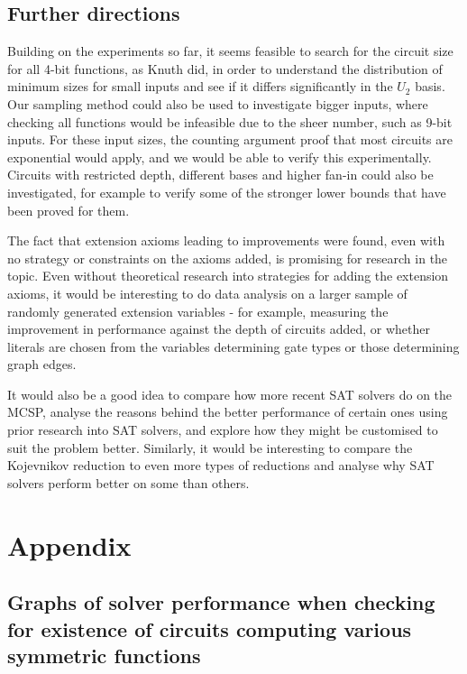 \documentclass{article}
\begin{document}
\subsection{Further directions}

Building on the experiments so far, it seems feasible to search for the circuit size for all 4-bit functions, as Knuth did, in order to understand the distribution of minimum sizes for small inputs and see if it differs significantly in the $U_2$ basis. Our sampling method could also be used to investigate bigger inputs, where checking all functions would be infeasible due to the sheer number, such as 9-bit inputs. For these input sizes, the counting argument proof that most circuits are exponential would apply, and we would be able to verify this experimentally. Circuits with restricted depth, different bases and higher fan-in could also be investigated, for example to verify some of the stronger lower bounds that have been proved for them.

The fact that extension axioms leading to improvements were found, even with no strategy or constraints on the axioms added, is promising for research in the topic. Even without theoretical research into strategies for adding the extension axioms, it would be interesting to do data analysis on a larger sample of randomly generated extension variables - for example, measuring the improvement in performance against the depth of circuits added, or whether literals are chosen from the variables determining gate types or those determining graph edges.

It would also be a good idea to compare how more recent SAT solvers do on the MCSP, analyse the reasons behind the better performance of certain ones using prior research into SAT solvers, and explore how they might be customised to suit the problem better. Similarly, it would be interesting to compare the Kojevnikov reduction to even more types of reductions and analyse why SAT solvers perform better on some than others.

 


\section{Appendix}

\subsection{Graphs of solver performance when checking for existence of circuits computing various symmetric functions}
\end{document}

